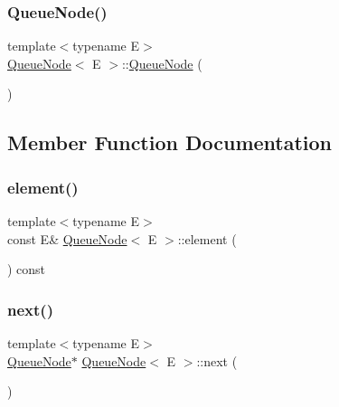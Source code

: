 \subsubsection{\texorpdfstring{Queue\+Node()}{QueueNode()}\hspace{0.1cm}{\footnotesize\ttfamily [2/2]}}
{\footnotesize\ttfamily template$<$typename E$>$ \\
\hyperlink{classQueueNode}{Queue\+Node}$<$ E $>$\+::\hyperlink{classQueueNode}{Queue\+Node} (\begin{DoxyParamCaption}\item[{const \hyperlink{classQueueNode}{Queue\+Node}$<$ E $>$ \&}]{ }\end{DoxyParamCaption})\hspace{0.3cm}{\ttfamily [private]}}



\subsection{Member Function Documentation}
\mbox{\label{classQueueNode_a1c61b3ed32e089f5901b87022ef84985}} 
\subsubsection{\texorpdfstring{element()}{element()}}
{\footnotesize\ttfamily template$<$typename E$>$ \\
const E\& \hyperlink{classQueueNode}{Queue\+Node}$<$ E $>$\+::element (\begin{DoxyParamCaption}{ }\end{DoxyParamCaption}) const\hspace{0.3cm}{\ttfamily [inline]}}

\mbox{\label{classQueueNode_a8a9fdf488da06533360999ef85db56ea}} 
\subsubsection{\texorpdfstring{next()}{next()}\hspace{0.1cm}{\footnotesize\ttfamily [1/2]}}
{\footnotesize\ttfamily template$<$typename E$>$ \\
\hyperlink{classQueueNode}{Queue\+Node}$\ast$ \hyperlink{classQueueNode}{Queue\+Node}$<$ E $>$\+::next (\begin{DoxyParamCaption}{ }\end{DoxyParamCaption})\hspace{0.3cm}{\ttfamily [inline]}}

